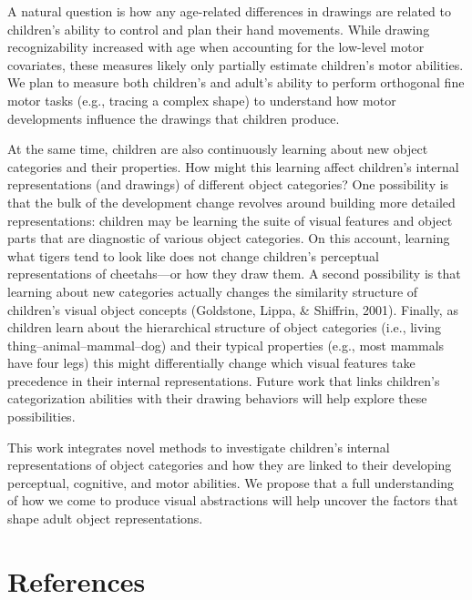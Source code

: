 \documentclass[10pt, letterpaper]{article}
\begin{document}
A natural question is how any age-related differences in drawings are
related to children's ability to control and plan their hand movements.
While drawing recognizability increased with age when accounting for the
low-level motor covariates, these measures likely only partially
estimate children's motor abilities. We plan to measure both children's
and adult's ability to perform orthogonal fine motor tasks (e.g.,
tracing a complex shape) to understand how motor developments influence
the drawings that children produce.

At the same time, children are also continuously learning about new
object categories and their properties. How might this learning affect
children's internal representations (and drawings) of different object
categories? One possibility is that the bulk of the development change
revolves around building more detailed representations: children may be
learning the suite of visual features and object parts that are
diagnostic of various object categories. On this account, learning what
tigers tend to look like does not change children's perceptual
representations of cheetahs---or how they draw them. A second
possibility is that learning about new categories actually changes the
similarity structure of children's visual object concepts (Goldstone,
Lippa, \& Shiffrin, 2001). Finally, as children learn about the
hierarchical structure of object categories (i.e., living
thing--animal--mammal--dog) and their typical properties (e.g., most
mammals have four legs) this might differentially change which visual
features take precedence in their internal representations. Future work
that links children's categorization abilities with their drawing
behaviors will help explore these possibilities.

This work integrates novel methods to investigate children's internal
representations of object categories and how they are linked to their
developing perceptual, cognitive, and motor abilities. We propose that a
full understanding of how we come to produce visual abstractions will
help uncover the factors that shape adult object representations.

\clearpage

\section{References}\label{references}

\setlength{\parindent}{-0.1in} \setlength{\leftskip}{0.125in} \noindent
\end{document}
